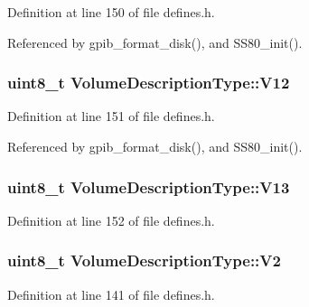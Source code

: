 Definition at line 150 of file defines.\+h.



Referenced by gpib\+\_\+format\+\_\+disk(), and S\+S80\+\_\+init().

\subsubsection[{\texorpdfstring{V12}{V12}}]{\setlength{\rightskip}{0pt plus 5cm}uint8\+\_\+t Volume\+Description\+Type\+::\+V12}\hypertarget{structVolumeDescriptionType_a96c6874117e4b64341e6c207bde061ae}{}\label{structVolumeDescriptionType_a96c6874117e4b64341e6c207bde061ae}


Definition at line 151 of file defines.\+h.



Referenced by gpib\+\_\+format\+\_\+disk(), and S\+S80\+\_\+init().

\subsubsection[{\texorpdfstring{V13}{V13}}]{\setlength{\rightskip}{0pt plus 5cm}uint8\+\_\+t Volume\+Description\+Type\+::\+V13}\hypertarget{structVolumeDescriptionType_ad3a75e21b674eadfa0db9d9df9672e16}{}\label{structVolumeDescriptionType_ad3a75e21b674eadfa0db9d9df9672e16}


Definition at line 152 of file defines.\+h.

\subsubsection[{\texorpdfstring{V2}{V2}}]{\setlength{\rightskip}{0pt plus 5cm}uint8\+\_\+t Volume\+Description\+Type\+::\+V2}\hypertarget{structVolumeDescriptionType_a0c89f2c3b579944fb549107411d97213}{}\label{structVolumeDescriptionType_a0c89f2c3b579944fb549107411d97213}


Definition at line 141 of file defines.\+h.

